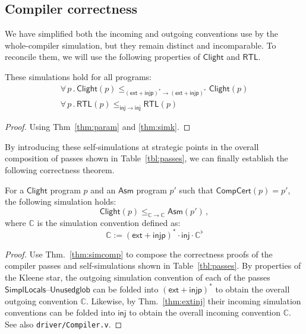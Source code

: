 \documentclass[sigplan,10pt,review,anonymous]{acmart}\settopmatter{printfolios=true,printccs=false,printacmref=false}
\newcommand{\kw}[1]{\ensuremath{ \mathsf{#1} }}
\begin{document}

\subsection{Compiler correctness} %

We have simplified both the incoming and outgoing conventions
use by the whole-compiler simulation,
but they remain distinct and incomparable.
To reconcile them,
we will use the following properties
of \kw{Clight} and \kw{RTL}.

\begin{theorem} \label{thm:lprops} %
These simulations hold
for all programs:
\begin{gather*}
\forall \, p \,.\,
  \kw{Clight}(p)
  \le_{(\kw{ext} + \kw{injp})^* \rightarrow (\kw{ext} + \kw{injp})^*}
  \kw{Clight}(p) \\
\forall \, p \,.\,
  \kw{RTL}(p)
  \le_{\kw{inj} \rightarrow \kw{inj}}
  \kw{RTL}(p)
\end{gather*}
\begin{proof}
Using Thm~\ref{thm:param} and \ref{thm:simk}.
\end{proof}
\end{theorem}

By introducing these self-simulations
at strategic points in the overall composition of passes
shown in Table~\ref{tbl:passes},
we can finally establish the following correctness theorem.

\begin{theorem} \label{thm:compc} %
For a \kw{Clight} program $p$
and an \kw{Asm} program $p'$ such that
$\kw{CompCert}(p) = p'$,
the following simulation holds:
\[
    \kw{Clight}(p) \le_{\mathbb{C} \rightarrow \mathbb{C}}
    \kw{Asm}(p') \,,
\]
where $\mathbb{C}$ is the simulation convention defined as:
\[
    \mathbb{C} := (\kw{ext} + \kw{injp})^* \cdot \kw{inj} \cdot
      \mathbb{C}^\flat
\]
\begin{proof}
Use Thm.~\ref{thm:simcomp} to compose
the correctness proofs of the compiler passes and
self-simulations shown in Table~\ref{tbl:passes}.
By properties of the Kleene star,
the outgoing simulation convention of each of the
passes \kw{SimplLocals}--\kw{Unusedglob}
can be folded into $(\kw{ext} + \kw{injp})^*$
to obtain the overall outgoing convention $\mathbb{C}$.
Likewise, by Thm.~\ref{thm:extinj}
their incoming simulation conventions
can be folded into $\kw{inj}$
to obtain the overall incoming convention $\mathbb{C}$.
See also \texttt{driver/Compiler.v}.
\end{proof}
\end{theorem}
\end{document}
